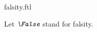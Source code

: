 \documentclass{stex}
\begin{document}
\begin{smodule}{falsity.ftl}


\begin{fakeforthel}
  \begin{convention}
    Let $\emph{\False}$ stand for falsity.
  \end{convention}
\end{fakeforthel}

\end{smodule}
\end{document}
